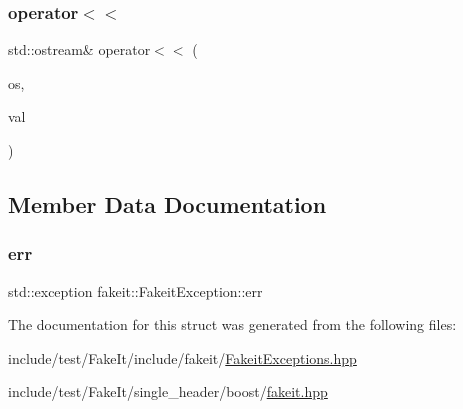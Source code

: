 \mbox{\label{structfakeit_1_1FakeitException_a8321660a372d94f410baf5fee0302fd7}} 
\subsubsection{\texorpdfstring{operator$<$$<$}{operator<<}\hspace{0.1cm}{\footnotesize\ttfamily [9/9]}}
{\footnotesize\ttfamily std\+::ostream\& operator$<$$<$ (\begin{DoxyParamCaption}\item[{std\+::ostream \&}]{os,  }\item[{const \mbox{\hyperlink{structfakeit_1_1FakeitException}{Fakeit\+Exception}} \&}]{val }\end{DoxyParamCaption})\hspace{0.3cm}{\ttfamily [friend]}}



\subsection{Member Data Documentation}
\mbox{\label{structfakeit_1_1FakeitException_a187acc5323edb9d34e28fa51fe2fb35c}} 
\subsubsection{\texorpdfstring{err}{err}}
{\footnotesize\ttfamily std\+::exception fakeit\+::\+Fakeit\+Exception\+::err}



The documentation for this struct was generated from the following files\+:\begin{DoxyCompactItemize}
\item 
include/test/\+Fake\+It/include/fakeit/\mbox{\hyperlink{FakeitExceptions_8hpp}{Fakeit\+Exceptions.\+hpp}}\item 
include/test/\+Fake\+It/single\+\_\+header/boost/\mbox{\hyperlink{single__header_2boost_2fakeit_8hpp}{fakeit.\+hpp}}\end{DoxyCompactItemize}
